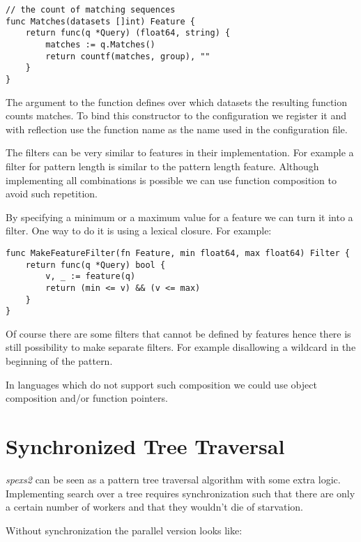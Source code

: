\begin{lstlisting}
// the count of matching sequences
func Matches(datasets []int) Feature {
    return func(q *Query) (float64, string) {
        matches := q.Matches()
        return countf(matches, group), ""
    }
}    
\end{lstlisting}

The argument to the function defines over which datasets the resulting function counts matches. To bind this constructor to the configuration we register it and with reflection use the function name as the name used in the configuration file.

The filters can be very similar to features in their implementation. For example a filter for pattern length is similar to the pattern length feature. Although implementing all combinations is possible we can use function composition to avoid such repetition.

By specifying a minimum or a maximum value for a feature we can turn it into a filter. One way to do it is using a lexical closure. For example:

\begin{lstlisting}
func MakeFeatureFilter(fn Feature, min float64, max float64) Filter {
    return func(q *Query) bool {
        v, _ := feature(q)
        return (min <= v) && (v <= max)
    }
}
\end{lstlisting}

Of course there are some filters that cannot be defined by features hence there is still possibility to make separate filters. For example disallowing a wildcard in the beginning of the pattern.

In languages which do not support such composition we could use object composition and/or function pointers.

\section{Synchronized Tree Traversal}

\emph{spexs2} can be seen as a pattern tree traversal algorithm with some extra logic. Implementing search over a tree requires synchronization such that there are only a certain number of workers and that they wouldn't die of starvation.

Without synchronization the parallel version looks like:

